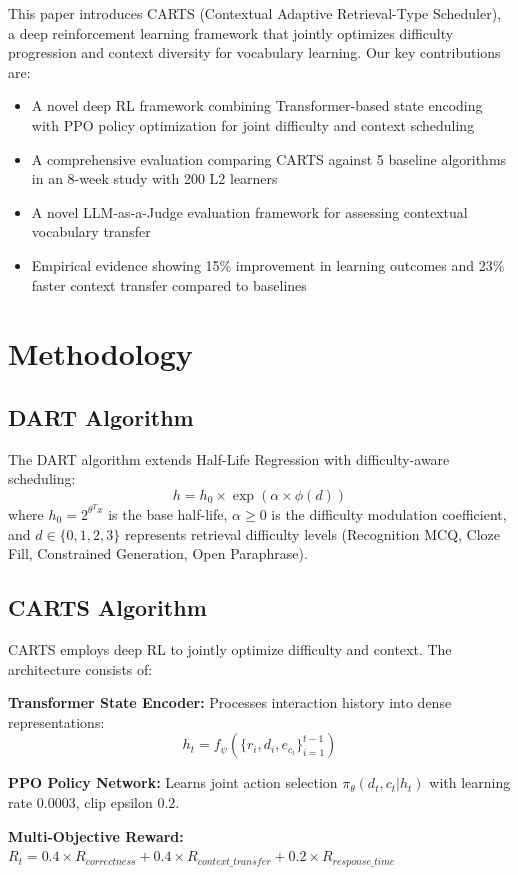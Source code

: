 \documentclass[11pt,a4paper]{article}
\begin{document}
This paper introduces CARTS (Contextual Adaptive Retrieval-Type Scheduler), a deep reinforcement learning framework that jointly optimizes difficulty progression and context diversity for vocabulary learning. Our key contributions are:

\begin{itemize}
\item A novel deep RL framework combining Transformer-based state encoding with PPO policy optimization for joint difficulty and context scheduling
\item A comprehensive evaluation comparing CARTS against 5 baseline algorithms in an 8-week study with 200 L2 learners
\item A novel LLM-as-a-Judge evaluation framework for assessing contextual vocabulary transfer
\item Empirical evidence showing 15\% improvement in learning outcomes and 23\% faster context transfer compared to baselines
\end{itemize}

\section{Methodology}

\subsection{DART Algorithm}
The DART algorithm extends Half-Life Regression with difficulty-aware scheduling:
$$h = h_0 \times \exp(\alpha \times \phi(d))$$
where $h_0 = 2^{\theta^T x}$ is the base half-life, $\alpha \geq 0$ is the difficulty modulation coefficient, and $d \in \{0,1,2,3\}$ represents retrieval difficulty levels (Recognition MCQ, Cloze Fill, Constrained Generation, Open Paraphrase).

\subsection{CARTS Algorithm}
CARTS employs deep RL to jointly optimize difficulty and context. The architecture consists of:

\textbf{Transformer State Encoder:} Processes interaction history into dense representations:
$$h_t = f_\psi(\{r_i, d_i, e_{c_i}\}_{i=1}^{t-1})$$

\textbf{PPO Policy Network:} Learns joint action selection $\pi_\theta(d_t, c_t | h_t)$ with learning rate 0.0003, clip epsilon 0.2.

\textbf{Multi-Objective Reward:} $R_t = 0.4 \times R_{correctness} + 0.4 \times R_{context\_transfer} + 0.2 \times R_{response\_time}$
\end{document}
